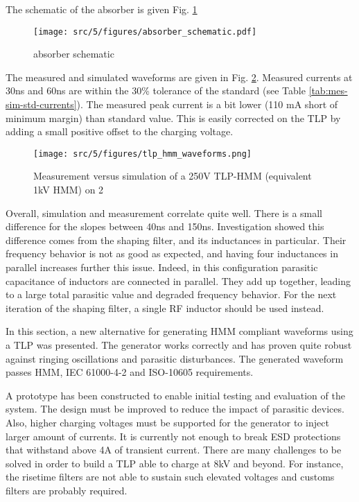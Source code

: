 The schematic of the absorber is given Fig. \ref{fig:absorber_schematic}

\begin{figure}[!h]
  \centering
  \texttt{[image: src/5/figures/absorber\_schematic.pdf]}
  \caption{absorber schematic}
  \label{fig:absorber_schematic}
\end{figure}

The measured and simulated waveforms are given in Fig. \ref{fig:tlp_hmm_waveforms}.
Measured currents at 30ns and 60ns are within the 30\% tolerance of the standard (see Table \ref{tab:mes-sim-std-currents}).
The measured peak current is a bit lower (110 mA short of minimum margin) than standard value.
This is easily corrected on the TLP by adding a small positive offset to the charging voltage.

\begin{figure}[!h]
  \centering
  \texttt{[image: src/5/figures/tlp\_hmm\_waveforms.png]}
  \caption{Measurement versus simulation of a 250V TLP-HMM (equivalent 1kV HMM) on 2\textOmega{}}
  \label{fig:tlp_hmm_waveforms}
\end{figure}

Overall, simulation and measurement correlate quite well.
There is a small difference for the slopes between 40ns and 150ns.
Investigation showed this difference comes from the shaping filter, and its inductances in particular.
Their frequency behavior is not as good as expected, and having four inductances in parallel increases further this issue.
Indeed, in this configuration parasitic capacitance of inductors are connected in parallel.
They add up together, leading to a large total parasitic value and degraded frequency behavior.
For the next iteration of the shaping filter, a single RF inductor should be used instead.


In this section, a new alternative for generating HMM compliant waveforms using a TLP was presented.
The generator works correctly and has proven quite robust against ringing oscillations and parasitic disturbances.
The generated waveform passes HMM, IEC 61000-4-2 and ISO-10605 requirements.

A prototype has been constructed to enable initial testing and evaluation of the system.
The design must be improved to reduce the impact of parasitic devices.
Also, higher charging voltages must be supported for the generator to inject larger amount of currents.
It is currently not enough to break ESD protections that withstand above 4A of transient current.
There are many challenges to be solved in order to build a TLP able to charge at 8kV and beyond.
For instance, the risetime filters are not able to sustain such elevated voltages and customs filters are probably required.

